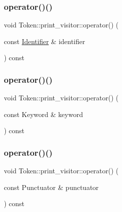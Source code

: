\subsubsection{\texorpdfstring{operator()()}{operator()()}\hspace{0.1cm}{\footnotesize\ttfamily [2/9]}}
{\footnotesize\ttfamily void Token\+::print\+\_\+visitor\+::operator() (\begin{DoxyParamCaption}\item[{const \hyperlink{struct_identifier}{Identifier} \&}]{identifier }\end{DoxyParamCaption}) const\hspace{0.3cm}{\ttfamily [inline]}}

\mbox{\label{struct_token_1_1print__visitor_a36d0662b3d8a3ae257a318d71a96e5ba}} 
\subsubsection{\texorpdfstring{operator()()}{operator()()}\hspace{0.1cm}{\footnotesize\ttfamily [3/9]}}
{\footnotesize\ttfamily void Token\+::print\+\_\+visitor\+::operator() (\begin{DoxyParamCaption}\item[{const Keyword \&}]{keyword }\end{DoxyParamCaption}) const\hspace{0.3cm}{\ttfamily [inline]}}

\mbox{\label{struct_token_1_1print__visitor_af16c79081b866ab87dda15bbc1a49edf}} 
\subsubsection{\texorpdfstring{operator()()}{operator()()}\hspace{0.1cm}{\footnotesize\ttfamily [4/9]}}
{\footnotesize\ttfamily void Token\+::print\+\_\+visitor\+::operator() (\begin{DoxyParamCaption}\item[{const Punctuator \&}]{punctuator }\end{DoxyParamCaption}) const\hspace{0.3cm}{\ttfamily [inline]}}

